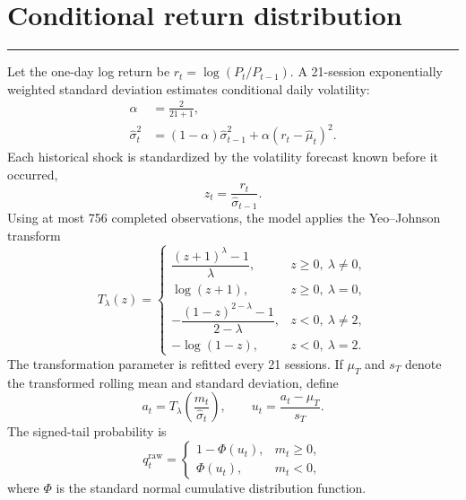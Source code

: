 \documentclass[11pt,a4paper]{article}
\newcommand{\sectionrule}{\vspace{-0.5em}\par\noindent\color{SignalGreen}\rule{\linewidth}{0.7pt}\color{Ink}\par\vspace{0.3em}}
\begin{document}
\section{Conditional return distribution}
\sectionrule
Let the one-day log return be $r_t=\log(P_t/P_{t-1})$. A 21-session exponentially weighted standard deviation estimates conditional daily volatility:
\begin{align}
\alpha &= \frac{2}{21+1},\\
\widehat{\sigma}^{2}_t
&=(1-\alpha)\widehat{\sigma}^{2}_{t-1}
  +\alpha\left(r_t-\widehat{\mu}_t\right)^2.
\end{align}
Each historical shock is standardized by the volatility forecast known before it occurred,
\begin{equation}
z_t=\frac{r_t}{\widehat{\sigma}_{t-1}}.
\end{equation}
Using at most 756 completed observations, the model applies the Yeo--Johnson transform
\begin{equation}
T_{\lambda}(z)=
\begin{cases}
\dfrac{(z+1)^{\lambda}-1}{\lambda}, & z\ge 0,\ \lambda\ne0,\\[6pt]
\log(z+1), & z\ge0,\ \lambda=0,\\[6pt]
-\dfrac{(1-z)^{2-\lambda}-1}{2-\lambda}, & z<0,\ \lambda\ne2,\\[6pt]
-\log(1-z), & z<0,\ \lambda=2.
\end{cases}
\label{eq:yeojohnson}
\end{equation}
The transformation parameter is refitted every 21 sessions. If $\mu_T$ and $s_T$ denote the transformed rolling mean and standard deviation, define
\begin{equation}
a_t=T_{\lambda}\!\left(\frac{m_t}{\widehat{\sigma}_t}\right),
\qquad
u_t=\frac{a_t-\mu_T}{s_T}.
\end{equation}
The signed-tail probability is
\begin{equation}
q^{\mathrm{raw}}_t=
\begin{cases}
1-\Phi(u_t), & m_t\ge0,\\
\Phi(u_t), & m_t<0,
\end{cases}
\label{eq:tail}
\end{equation}
where $\Phi$ is the standard normal cumulative distribution function.
\end{document}

